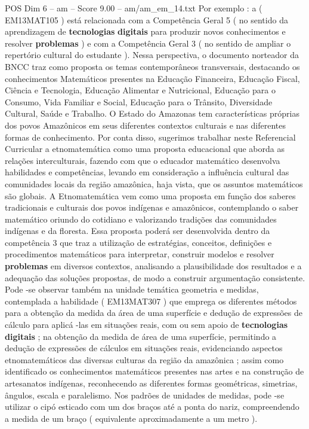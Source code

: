 \begin{textsample}{POS Dim 6 – am – Score 9.00 – am/am\_em\_14.txt}
Por exemplo : a ( EM13MAT105 ) está relacionada com a Competência Geral 5 ( no sentido da aprendizagem de \textbf{tecnologias} \textbf{digitais} para produzir novos conhecimentos e resolver \textbf{problemas} ) e com a Competência Geral 3 ( no sentido de ampliar o repertório cultural do estudante ).
Nessa perspectiva, o documento norteador da BNCC traz como proposta os temas contemporâneos transversais, destacando os conhecimentos Matemáticos presentes na Educação Financeira, Educação Fiscal, Ciência e Tecnologia, Educação Alimentar e Nutricional, Educação para o Consumo, Vida Familiar e Social, Educação para o Trânsito, Diversidade Cultural, Saúde e Trabalho.
O Estado do Amazonas tem características próprias dos povos Amazônicos em seus diferentes contextos culturais e nas diferentes formas de conhecimento.
Por conta disso, sugerimos trabalhar neste Referencial Curricular a etnomatemática como uma proposta educacional que aborda as relações interculturais, fazendo com que o educador matemático desenvolva habilidades e competências, levando em consideração a influência cultural das comunidades locais da região amazônica, haja vista, que os assuntos matemáticos são globais.
A Etnomatemática vem como uma proposta em função dos saberes tradicionais e culturais dos povos indígenas e amazônicos, contemplando o saber matemático oriundo do cotidiano e valorizando tradições das comunidades indígenas e da floresta.
Essa proposta poderá ser desenvolvida dentro da competência 3 que traz a utilização de estratégias, conceitos, definições e procedimentos matemáticos para interpretar, construir modelos e resolver \textbf{problemas} em diversos contextos, analisando a plausibilidade dos resultados e a adequação das soluções propostas, de modo a construir argumentação consistente.
Pode -se observar também na unidade temática geometria e medidas, contemplada a habilidade ( EM13MAT307 ) que emprega os diferentes métodos para a obtenção da medida da área de uma superfície e dedução de expressões de cálculo para aplicá -las em situações reais, com ou sem apoio de \textbf{tecnologias} \textbf{digitais} ; na obtenção da medida de área de uma superfície, permitindo a dedução de expressões de cálculos em situações reais, evidenciando aspectos etnomatemáticos das diversas culturas da região da amazônica ; assim como identificado os conhecimentos matemáticos presentes nas artes e na construção de artesanatos indígenas, reconhecendo as diferentes formas geométricas, simetrias, ângulos, escala e paralelismo.
Nos padrões de unidades de medidas, pode -se utilizar o cipó esticado com um dos braços até a ponta do nariz, compreendendo a medida de um braço ( equivalente aproximadamente a um metro ).

\end{textsample}
